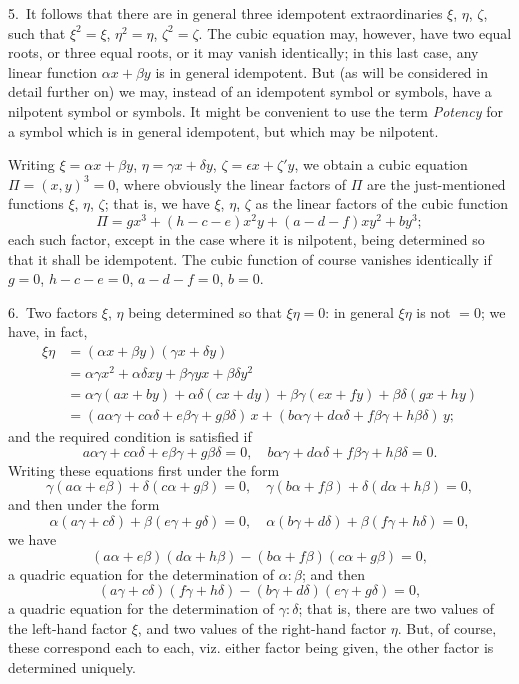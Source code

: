 \documentclass[11pt,a4paper]{article}
\theoremstyle{plain}
\theoremstyle{definition}
\theoremstyle{remark}
\begin{document}
5.~It follows that there are in general three idempotent extraordinaries $\xi$, $\eta$, $\zeta$, such that $\xi^2=\xi$, $\eta^2=\eta$, $\zeta^2=\zeta$. The cubic equation may, however, have two equal roots, or three equal roots, or it may vanish identically; in this last case, any linear function $\alpha x + \beta y$ is in general idempotent. But (as will be considered in detail further on) we may, instead of an idempotent symbol or symbols, have a nilpotent symbol or symbols. It might be convenient to use the term \textit{Potency} for a symbol which is in general idempotent, but which may be nilpotent.

Writing $\xi = \alpha x + \beta y$, $\eta = \gamma x + \delta y$, $\zeta = \epsilon x + \zeta' y$, we obtain a cubic equation $\Pi = (x,y)^3 = 0$, where obviously the linear factors of $\Pi$ are the just-mentioned functions $\xi$, $\eta$, $\zeta$; that is, we have $\xi$, $\eta$, $\zeta$ as the linear factors of the cubic function
\[
\Pi = gx^3 + (h-c-e)x^2y + (a-d-f)xy^2 + by^3;
\]
each such factor, except in the case where it is nilpotent, being determined so that it shall be idempotent. The cubic function of course vanishes identically if $g=0$, $h-c-e=0$, $a-d-f=0$, $b=0$.

6.~Two factors $\xi$, $\eta$ being determined so that $\xi\eta=0$: in general $\xi\eta$ is not $=0$; we have, in fact,
\begin{align*}
\xi\eta &= (\alpha x + \beta y)(\gamma x + \delta y) \\
&= \alpha\gamma x^2 + \alpha\delta xy + \beta\gamma yx + \beta\delta y^2 \\
&= \alpha\gamma(ax+by) + \alpha\delta(cx+dy) + \beta\gamma(ex+fy) + \beta\delta(gx+hy) \\
&= (a\alpha\gamma + c\alpha\delta + e\beta\gamma + g\beta\delta)\,x + (b\alpha\gamma + d\alpha\delta + f\beta\gamma + h\beta\delta)\,y;
\end{align*}
and the required condition is satisfied if
\[
a\alpha\gamma + c\alpha\delta + e\beta\gamma + g\beta\delta = 0,\quad b\alpha\gamma + d\alpha\delta + f\beta\gamma + h\beta\delta = 0.
\]
Writing these equations first under the form
\[
\gamma(a\alpha + e\beta) + \delta(c\alpha + g\beta) = 0,\quad \gamma(b\alpha + f\beta) + \delta(d\alpha + h\beta) = 0,
\]
and then under the form
\[
\alpha(a\gamma + c\delta) + \beta(e\gamma + g\delta) = 0,\quad \alpha(b\gamma + d\delta) + \beta(f\gamma + h\delta) = 0,
\]
we have
\[
(a\alpha + e\beta)(d\alpha + h\beta) - (b\alpha + f\beta)(c\alpha + g\beta) = 0,
\]
a quadric equation for the determination of $\alpha:\beta$; and then
\[
(a\gamma + c\delta)(f\gamma + h\delta) - (b\gamma + d\delta)(e\gamma + g\delta) = 0,
\]
a quadric equation for the determination of $\gamma:\delta$; that is, there are two values of the left-hand factor $\xi$, and two values of the right-hand factor $\eta$. But, of course, these correspond each to each, viz. either factor being given, the other factor is determined uniquely.
\end{document}
